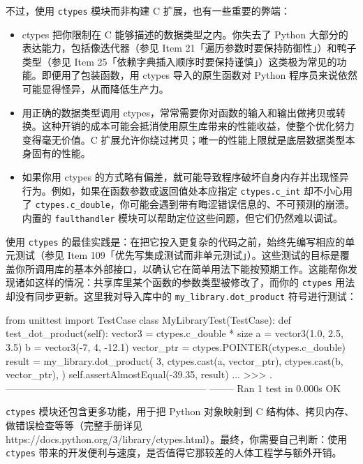 不过，使用 \texttt{ctypes} 模块而非构建 C 扩展，也有一些重要的弊端：

\begin{itemize}
\item ctypes 把你限制在 C 能够描述的数据类型之内。你失去了 Python 大部分的表达能力，包括像迭代器（参见 Item 21「遍历参数时要保持防御性」）和鸭子类型（参见 Item 25「依赖字典插入顺序时要保持谨慎」）这类极为常见的功能。即便用了包装函数，用 ctypes 导入的原生函数对 Python 程序员来说依然可能显得怪异，从而降低生产力。
\item 用正确的数据类型调用 ctypes，常常需要你对函数的输入和输出做拷贝或转换。这种开销的成本可能会抵消使用原生库带来的性能收益，使整个优化努力变得毫无价值。C 扩展允许你绕过拷贝；唯一的性能上限就是底层数据类型本身固有的性能。
\item 如果你用 ctypes 的方式略有偏差，就可能导致程序破坏自身内存并出现怪异行为。例如，如果在函数参数或返回值处本应指定 \texttt{ctypes.c\_int} 却不小心用了 \texttt{ctypes.c\_double}，你可能会遇到带有晦涩错误信息的、不可预测的崩溃。内置的 \texttt{faulthandler} 模块可以帮助定位这些问题，但它们仍然难以调试。
\end{itemize}

使用 \texttt{ctypes} 的最佳实践是：在把它投入更复杂的代码之前，始终先编写相应的单元测试（参见 Item 109「优先写集成测试而非单元测试」）。这些测试的目标是覆盖你所调用库的基本外部接口，以确认它在简单用法下能按预期工作。这能帮你发现诸如这样的情况：共享库里某个函数的参数类型被修改了，而你的 \texttt{ctypes} 用法却没有同步更新。这里我对导入库中的 \texttt{my\_library.dot\_product} 符号进行测试：

\begin{codebox}[python]
from unittest import TestCase
class MyLibraryTest(TestCase):
    def test_dot_product(self):
        vector3 = ctypes.c_double * size
        a = vector3(1.0, 2.5, 3.5)
        b = vector3(-7, 4, -12.1)
        vector_ptr = ctypes.POINTER(ctypes.c_double)
        result = my_library.dot_product(
            3,
            ctypes.cast(a, vector_ptr),
            ctypes.cast(b, vector_ptr),
        )
        self.assertAlmostEqual(-39.35, result)
...
>>>
.
--------------------------------------------------------------
--------
Ran 1 test in 0.000s
OK
\end{codebox}

\texttt{ctypes} 模块还包含更多功能，用于把 Python 对象映射到 C 结构体、拷贝内存、做错误检查等等（完整手册详见 https://docs.python.org/3/library/ctypes.html）。最终，你需要自己判断：使用 \texttt{ctypes} 带来的开发便利与速度，是否值得它那较差的人体工程学与额外开销。

